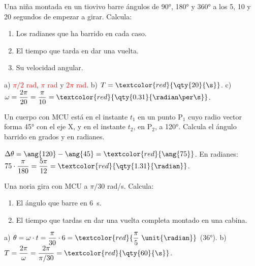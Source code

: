 \begin{exercise}
    Una niña montada en un tiovivo barre ángulos de \ang{90}, \ang{180} y \ang{360} a los 5, 10 y 20 segundos de empezar a girar. Calcula:
    \begin{enumerate}[label=\alph*)]
        \item Los radianes que ha barrido en cada caso.
        \item El tiempo que tarda en dar una vuelta.
        \item Su velocidad angular.
    \end{enumerate}
    \begin{solu}
        a) \textcolor{red}{\(\pi/2\) rad}, \textcolor{red}{\(\pi\) rad} y \textcolor{red}{\(2\pi\) rad}. b) \(T = \textcolor{red}{\qty{20}{\s}}\). c) \(\omega = \dfrac{2\pi}{20} = \dfrac{\pi}{10} = \textcolor{red}{\qty{0.31}{\radian\per\s}}\).
    \end{solu}
\end{exercise}

\begin{exercise}
    Un cuerpo con MCU está en el instante \(t_1\) en un punto P\(_1\) cuyo radio vector forma \ang{45} con el eje X, y en el instante \(t_2\), en P\(_2\), a \ang{120}. Calcula el ángulo barrido en grados y en radianes.
    \begin{solu}
        \(\Delta\theta = \ang{120} - \ang{45} = \textcolor{red}{\ang{75}}\). En radianes: \(75 \cdot \dfrac{\pi}{180} = \dfrac{5\pi}{12} = \textcolor{red}{\qty{1.31}{\radian}}\).
    \end{solu}
\end{exercise}

\begin{exercise}
    Una noria gira con MCU a \(\pi/30\) rad/s. Calcula:
    \begin{enumerate}[label=\alph*)]
        \item El ángulo que barre en \qty{6}{\s}.
        \item El tiempo que tardas en dar una vuelta completa montado en una cabina.
    \end{enumerate}
    \begin{solu}
        a) \(\theta = \omega \cdot t = \dfrac{\pi}{30} \cdot 6 = \textcolor{red}{\dfrac{\pi}{5}~\unit{\radian}}\) (\ang{36}). b) \(T = \dfrac{2\pi}{\omega} = \dfrac{2\pi}{\pi/30} = \textcolor{red}{\qty{60}{\s}}\).
    \end{solu}
\end{exercise}

